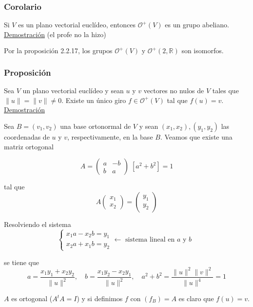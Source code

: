 \documentclass[12pt, a4paper, ones, notitlepage, openany,titlepage]{article}
\begin{document}
\subsubsection{Corolario}
Si $V$ es un plano vectorial euclídeo, entonces $\mathcal{O}^{+}(V)$ es un grupo abeliano.\\

\noindent\underline{Demostración} (el profe no la hizo)

Por la proposición 2.2.17, los grupos $\mathcal{O}^{+}(V)$ y $\mathcal{O}^{+}(2, \mathbb{R})$ son isomorfos.

\subsubsection{Proposición}
Sea $V$ un plano vectorial euclídeo y sean $u$ y $v$ vectores no nulos de $V$ tales que $\|u\|=\|v\| \neq 0$. Existe un único giro $f \in \mathcal{O}^{+}(V)$ tal que $f(u)=v$.\\

\noindent\underline{Demostración}

Sea $B=\left(v_{1}, v_{2}\right)$ una base ortonormal de $V$ y sean $\left(x_{1}, x_{2}\right),\left(y_{1}, y_{2}\right)$ las coordenadas de $u$ y $v$, respectivamente, en la base $B$. Veamos que existe una matriz ortogonal

$$
A=\left(\begin{array}{rr}
	a & -b \\
	b & a
\end{array}\right)
\; [a^2 + b^2] = 1
$$

tal que
$$
A\left(\begin{array}{l}
	x_{1} \\
	x_{2}
\end{array}\right)=\left(\begin{array}{l}
	y_{1} \\
	y_{2}
\end{array}\right)
$$

Resolviendo el sistema
$$
\begin{cases}
	x_{1} a-x_{2} b=y_{1} \\ x_{2} a+x_{1} b=y_{2}
\end{cases}
\longleftarrow \text{ sistema lineal en $a$ y $b$ }
$$

se tiene que
$$
a=\frac{x_{1} y_{1}+x_{2} y_{2}}{\|u\|^{2}}, \quad b=\frac{x_{1} y_{2}-x_{2} y_{1}}{\|u\|^{2}}, \quad a^{2}+b^{2}=\frac{\|u\|^{2}\|v\|^{2}}{\|u\|^{4}}=1
$$

$A$ es ortogonal ($A^t A = I$) y si definimos $f$ con $(f_B) = A$ es claro que $f(u)=v$.\\
\end{document}
